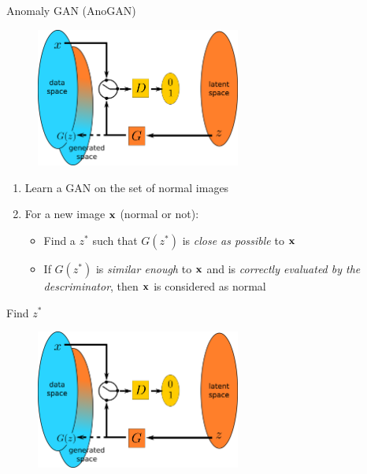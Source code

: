\documentclass[xcolor=pdftex,dvipsnames,table,mathserif]{beamer}
\begin{document}
\begin{frame}{Anomaly GAN (AnoGAN) \cite{schlegl_unsupervised_2017}}

  \begin{figure}[ht]
    \centering
    \includegraphics[width=0.6\textwidth]{gan2}
  \end{figure}

  \begin{enumerate}
  \item Learn a GAN on the set of normal images
  \item For a new image $\mathbf{x}$ (normal or not):
    \begin{itemize}
    \item Find a $z^*$ such that $G(z^*)$ is \emph{close as possible} to $\mathbf{x}$
    \item If $G(z^*)$ is \emph{similar enough} to $\mathbf{x}$ and is \emph{correctly evaluated by the descriminator}, then $\mathbf{x}$ is considered as normal
    \end{itemize}
  \end{enumerate}

\end{frame}

\begin{frame}{Find $z^*$}

  \begin{figure}[ht]
    \centering
    \includegraphics[width=0.6\textwidth]{gan2}
  \end{figure}



\end{frame}
\end{document}
